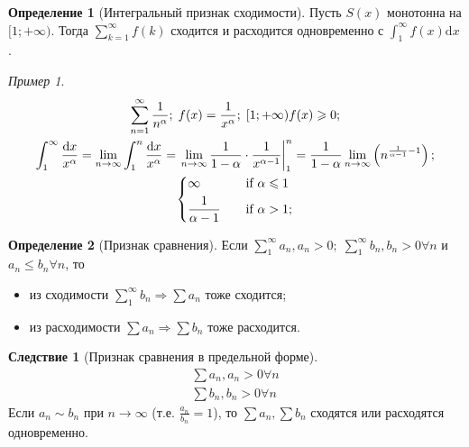 \documentclass[a4paper,12pt]{article}
\theoremstyle{remark}
\newtheorem*{example}{Пример}
\theoremstyle{definition}
\newtheorem{definition}{Определение}
\newtheorem*{effect}{Следствие}
\begin{document}
\begin{definition}[Интегральный признак сходимости]
    Пусть \(S(x)\) монотонна на \([1;+\infty)\). Тогда \(\sum_{k = 1}^{\infty} f(k)\) сходится и расходится одновременно с \(\int_{1}^{\infty} \! f(x) \mathrm{d}x\).
\end{definition}

\begin{example}
    \begin{gather*}
        \sum_{n=1}^{\infty} \frac{1}{n^\alpha};\; f(x) = \frac{1}{x^\alpha};\; [1;+\infty) f(x) \geqslant 0; \\
        \int_{1}^{\infty} \frac{\mathrm{d}x}{x^\alpha} = \lim_{n \rightarrow \infty} \int_{1}^{n} \frac{\mathrm{d}x}{x^\alpha} = \left. \lim_{n \rightarrow \infty} \frac{1}{1 - \alpha} \cdot \frac{1}{x^{\alpha - 1}} \right |_1^n = \frac{1}{1 - \alpha} \lim_{n \rightarrow \infty} \left(n^{\frac{1}{\alpha - 1} - 1}\right); \\
        \begin{dcases}
            \infty & \quad \text{if } \alpha \leqslant 1 \\
            \frac{1}{\alpha - 1} & \quad \text{if } \alpha > 1;
        \end{dcases}
    \end{gather*}    
\end{example}


\begin{definition}[Признак сравнения]
    Если \(\sum_{1}^{\infty} a_n, a_n > 0;\; \sum_{1}^{\infty} b_n, b_n > 0 \forall n\) и \(a_n \leqslant b_n \forall n\), то
    \begin{itemize}
        \item из сходимости \(\sum_{1}^{\infty} b_n \Rightarrow \sum a_n\) тоже сходится;
        \item из расходимости \(\sum a_n \Rightarrow \sum b_n\) тоже расходится.
    \end{itemize}
\end{definition}

\begin{effect}[Признак сравнения в предельной форме]
    \begin{gather*}
        \sum a_n, a_n > 0 \forall n \\
        \sum b_n, b_n > 0 \forall n
    \end{gather*}
    Если \(a_n \sim b_n\) при \(n \rightarrow \infty\) (т.е. \(\frac{a_n}{b_n} = 1\)), то \(\sum a_n, \sum b_n\) сходятся или расходятся одновременно.
\end{effect}
\end{document}
